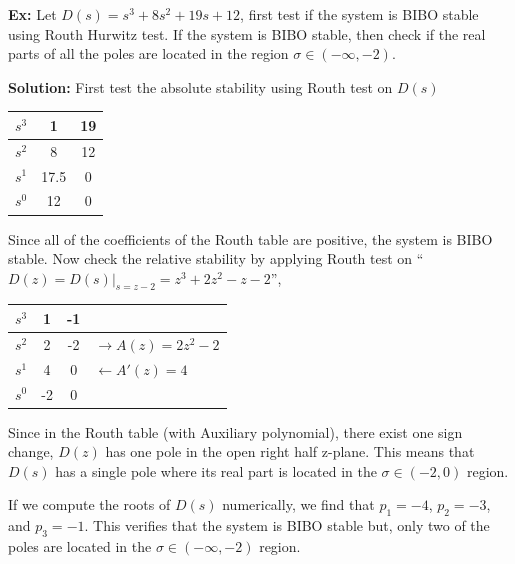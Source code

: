 \documentclass[twoside]{article}
\begin{document}
\textbf{Ex:} Let $D(s) = s^3 + 8 s^2 + 19 s + 12$, first test if the
system is BIBO stable using Routh Hurwitz test. If the system is BIBO 
stable, then check if the real parts of all the poles are located in the
region $\sigma \in (-\infty , -2)$.

\textbf{Solution:} First test the absolute stability using Routh test
on $D(s)$

\vspace{6pt}
\begin{minipage}[h]{1\linewidth}
\begin{center}
\begin{tabular}{|c || c || c  |}
\hline
$s^3$ & 1 & 19
\\ \hline
$s^2$ & 8 & 12
\\ \hline
$s^1$ & 17.5 & 0 
\\ \hline
$s^0$ & 12 & 0  
\\ \hline
\end{tabular}
\end{center}
\end{minipage}
\vspace{6pt}

Since all of the coefficients of the Routh table are positive, the
system is BIBO stable. Now check the relative stability by applying
Routh test on  ``$D(z) = D(s)|_{s = z - 2} =  z^3 + 2 z^2 - z - 2$'',

\vspace{6pt}
\begin{minipage}[h]{1\linewidth}
\begin{center}
\begin{tabular}{|c || c || c | l |}
\hline
$s^3$ & 1 & -1 & 
\\ \hline
$s^2$ & 2 & -2 & $\rightarrow A(z) = 2 z^2 - 2$
\\ \hline
$s^1$ & 4 & 0 & $\leftarrow A'(z) = 4 $
\\ \hline
$s^0$ & -2 & 0 &
\\ \hline
\end{tabular}
\end{center}
\end{minipage}
\vspace{6pt}

Since in the Routh table (with Auxiliary polynomial), there exist one
sign change, $D(z)$ has one pole in the open right half z-plane.
This means that $D(s)$ has a single pole where its real part is 
located in the $\sigma \in (-2 , 0)$ region.

If we compute the roots of $D(s)$ numerically, we find that
$p_1 = -4$, $p_2 = -3$, and $p_3 = -1$. This verifies that
the system is BIBO stable but, only two of the poles are located
in the $\sigma \in (-\infty , -2)$ region.  
\end{document}

